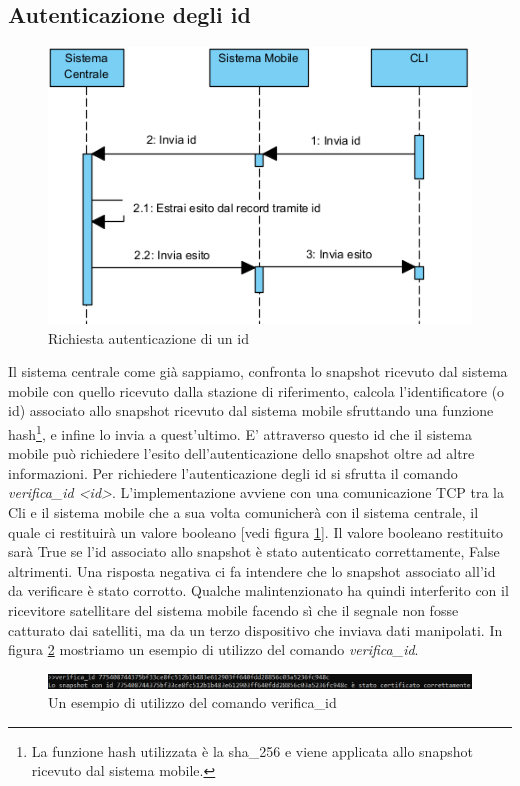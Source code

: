 \subsection{Autenticazione degli id}\label{autenticazionedegliid}
\begin{figure}[!h]
\centering
\includegraphics[scale=0.9]{images/Richiesta autenticazione id.png}
\caption{Richiesta autenticazione di un id}
\label{fig: richiesta_autenticazione_id }
\end{figure}
Il sistema centrale come già sappiamo, confronta lo snapshot ricevuto dal sistema mobile con quello ricevuto dalla stazione di riferimento, calcola l'identificatore (o id) associato allo snapshot ricevuto dal sistema mobile sfruttando una funzione hash\footnote{La funzione hash utilizzata è la sha\_256 e viene applicata allo snapshot ricevuto dal sistema mobile.}, e infine lo invia a quest'ultimo. E' attraverso questo id che il sistema mobile può richiedere l'esito dell'autenticazione dello snapshot oltre ad altre informazioni. Per richiedere l'autenticazione degli id si sfrutta il comando \textit{verifica\_id <id>}. L'implementazione avviene con una comunicazione TCP tra la Cli e il sistema mobile che a sua volta comunicherà con il sistema centrale, il quale ci restituirà un valore booleano [vedi figura \ref{fig: richiesta_autenticazione_id }]. Il valore booleano restituito sarà True se l'id associato allo snapshot è stato autenticato correttamente, False altrimenti. Una risposta negativa ci fa intendere che lo snapshot associato all'id da verificare è stato corrotto. Qualche malintenzionato ha quindi interferito con il ricevitore satellitare del sistema mobile facendo sì che il segnale non fosse catturato dai satelliti, ma da un terzo dispositivo che inviava dati manipolati. In figura \ref{fig: verifica_id } mostriamo un esempio di utilizzo del comando \textit{verifica\_id}.
\begin{figure}[!h]
\centering
\includegraphics[scale=0.8]{images/verifica_id.png}
\caption{Un esempio di utilizzo del comando verifica\_id}
\label{fig: verifica_id }
\end{figure}


